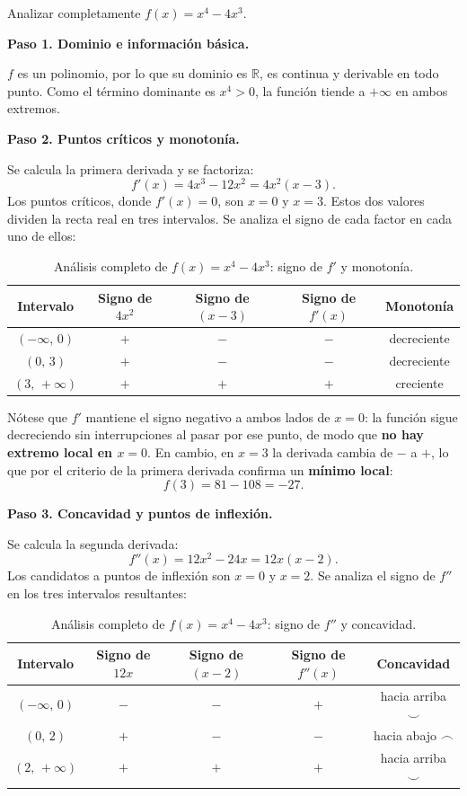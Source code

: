 \begin{example}[Análisis completo de $f(x)=x^4-4x^3$]
Analizar completamente $f(x)=x^4-4x^3$.
\begin{myproof}
\textbf{Paso 1. Dominio e información básica.}

$f$ es un polinomio, por lo que su dominio es $\mathbb{R}$, es continua
y derivable en todo punto. Como el término dominante es $x^4>0$, la
función tiende a $+\infty$ en ambos extremos.

\textbf{Paso 2. Puntos críticos y monotonía.}

Se calcula la primera derivada y se factoriza:
\[
f'(x) = 4x^3 - 12x^2 = 4x^2(x-3).
\]
Los puntos críticos, donde $f'(x)=0$, son $x=0$ y $x=3$. Estos dos
valores dividen la recta real en tres intervalos. Se analiza el signo
de cada factor en cada uno de ellos:

\begin{table}[H]
\centering
\begin{tabular}{c c c c c}
\toprule
Intervalo & Signo de $4x^2$ & Signo de $(x-3)$ & Signo de $f'(x)$
& Monotonía \\
\midrule
$(-\infty,\,0)$ & $+$ & $-$ & $-$ & decreciente \\
$(0,\,3)$       & $+$ & $-$ & $-$ & decreciente \\
$(3,\,+\infty)$ & $+$ & $+$ & $+$ & creciente   \\
\bottomrule
\end{tabular}
\caption{Análisis completo de $f(x)=x^4-4x^3$: signo de $f'$ y monotonía.}
\end{table}

Nótese que $f'$ mantiene el signo negativo a ambos lados de $x=0$: la
función sigue decreciendo sin interrupciones al pasar por ese punto, de
modo que \textbf{no hay extremo local en $x=0$}. En cambio, en $x=3$
la derivada cambia de $-$ a $+$, lo que por el criterio de la primera
derivada confirma un \textbf{mínimo local}:
\[
f(3) = 81 - 108 = -27.
\]

\textbf{Paso 3. Concavidad y puntos de inflexión.}

Se calcula la segunda derivada:
\[
f''(x) = 12x^2 - 24x = 12x(x-2).
\]
Los candidatos a puntos de inflexión son $x=0$ y $x=2$. Se analiza el
signo de $f''$ en los tres intervalos resultantes:

\begin{table}[H]
\centering
\begin{tabular}{c c c c c}
\toprule
Intervalo & Signo de $12x$ & Signo de $(x-2)$ & Signo de $f''(x)$
& Concavidad \\
\midrule
$(-\infty,\,0)$ & $-$ & $-$ & $+$ & hacia arriba $\smile$ \\
$(0,\,2)$       & $+$ & $-$ & $-$ & hacia abajo  $\frown$ \\
$(2,\,+\infty)$ & $+$ & $+$ & $+$ & hacia arriba $\smile$ \\
\bottomrule
\end{tabular}
\caption{Análisis completo de $f(x)=x^4-4x^3$: signo de $f''$ y concavidad.}
\end{table}


\end{myproof}
\end{example}
